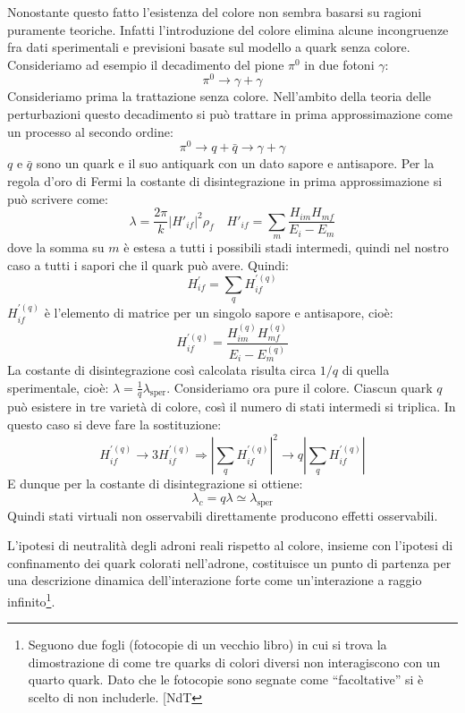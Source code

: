 Nonostante questo fatto l'esistenza del colore non sembra basarsi su ragioni 
puramente teoriche.
Infatti l'introduzione del colore elimina alcune incongruenze fra dati 
sperimentali e previsioni basate sul
modello a quark senza colore.
Consideriamo ad esempio il decadimento del pione $\pi^0$ in due fotoni $\gamma$:
\[
\pi^0\rightarrow\gamma+\gamma
\]
Consideriamo prima la trattazione senza colore. Nell'ambito della teoria delle 
perturbazioni questo decadimento
si può trattare in prima approssimazione come un processo al secondo ordine:
\begin{equation}
\pi^0\rightarrow q+\bar{q}\rightarrow\gamma+\gamma
\end{equation}
$q$ e $\bar{q}$ sono un quark e il suo antiquark con un dato sapore e 
antisapore. Per la regola d'oro di Fermi la
costante di disintegrazione in prima approssimazione si può scrivere come:
\begin{equation}
\lambda=\frac{2\pi}{k}|H'_{if}|^2\rho_f\quad 
H'_{if}=\sum_m\frac{H_{im}H_{mf}}{E_i-E_m}
\end{equation}
dove la somma su $m$ è estesa a tutti i possibili stadi intermedi, quindi nel 
nostro caso a tutti i sapori che
il quark può avere. Quindi:
\[
H_{if}^{'}=\sum_q H_{if}^{'(q)}
\]
$H_{if}^{'(q)}$ è l'elemento di matrice per un singolo sapore e antisapore, 
cioè:
\[
H_{if}^{'(q)}=\frac{H_{im}^{(q)}H_{mf}^{(q)}}{E_i-E_m^{(q)}}
\]
La costante di disintegrazione così calcolata risulta circa $1/q$ di quella 
sperimentale,
cioè: $\lambda=\frac{1}{q}\lambda_{\text{sper}}$.
Consideriamo ora pure il colore. Ciascun quark $q$ può esistere in tre 
varietà di colore, così il numero di
stati intermedi si triplica. In questo caso si deve fare la sostituzione:
\[
H_{if}^{'(q)}\rightarrow 3H_{if}^{'(q)}\Rightarrow |\sum_q 
H_{if}^{'(q)}|^2\rightarrow q|\sum_q H_{if}^{'(q)}|
\]
E dunque per la costante di disintegrazione si ottiene:
\[
\lambda_c=q\lambda\simeq\lambda_{\text{sper}}
\]
Quindi stati virtuali non osservabili direttamente producono effetti 
osservabili.

L'ipotesi di neutralità degli adroni reali rispetto al colore, insieme con
l'ipotesi di confinamento dei quark colorati nell'adrone, costituisce un punto
di partenza per una descrizione dinamica dell'interazione forte come
un'interazione a raggio infinito\footnote{Seguono due fogli (fotocopie di un
  vecchio libro) in cui si trova la dimostrazione di come tre quarks di colori
  diversi non interagiscono con un quarto quark. Dato che le fotocopie sono
segnate come ``facoltative'' si è scelto di non includerle. [NdT}.

